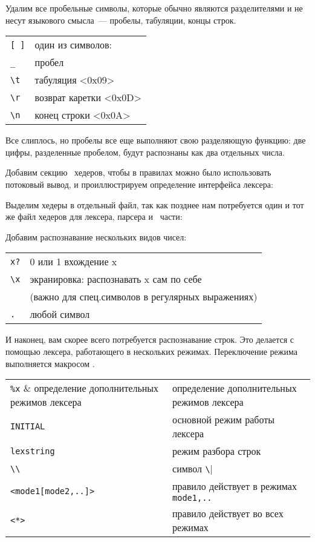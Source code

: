 Удалим все пробельные символы, которые обычно
являются разделителями и не несут языкового смысла\ --- пробелы, табуляции,
концы строк.
\begin{tabular}{l l}
\verb|[ ]| & один из символов: \\
\verb|_| & пробел \\
\verb|\t| & табуляция <0x09> \\
\verb|\r| & возврат каретки <0x0D> \\
\verb|\n| & конец строки <0x0A> \\
\end{tabular}

Все слиплось, но пробелы все еще выполняют свою разделяющую функцию: две цифры,
разделенные пробелом, будут распознаны как два отдельных числа.

\bigskip
Добавим секцию \cpp\ хедеров, чтобы в правилах можно было использовать потоковый
вывод, и проиллюстрируем определение интерфейса лексера:


Выделим хедеры в отдельный файл, так как позднее нам потребуется один и тот же
файл хедеров для лексера, парсера и \cpp\  части:


Добавим распознавание нескольких видов чисел: 

\begin{tabular}{l l}
\verb|x?| & 0 или 1 вхождение x \\
\verb|\x| & экранировка: распознавать x сам по себе \\&(важно для
спец.символов в регулярных выражениях)\\
\verb|.| & любой символ \\
\end{tabular}

И наконец, вам скорее всего потребуется распознавание строк. Это делается с
помощью лексера, работающего в нескольких режимах. Переключение режима
выполняется макросом .

\begin{tabular}{l l}
\verb|%x| & определение дополнительных режимов лексера \\
\verb|INITIAL| & основной режим работы лексера \\
\verb|lexstring| & режим разбора строк \\
\verb|\\| & символ \verb|\| \\
\verb|<mode1[mode2,..]>| & правило действует в режимах \verb|mode1,..| \\
\verb|<*>| & правило действует во всех режимах \\
\end{tabular}
